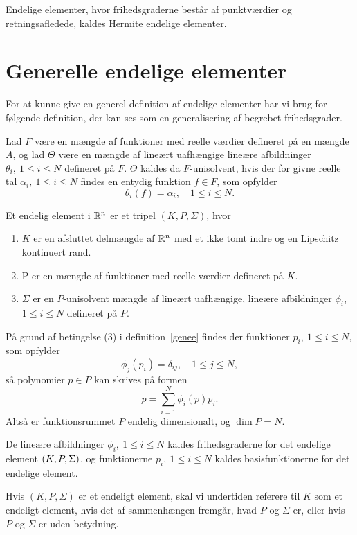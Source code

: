 \begin{definition}
Endelige elementer, hvor frihedsgraderne består af punktværdier og
retningsafledede, kaldes Hermite endelige elementer.
\end{definition}

\section{Generelle endelige elementer}
For at kunne give en generel definition af endelige elementer har vi
brug for følgende definition, der kan ses som en generalisering af
begrebet frihedsgrader.
\begin{definition}
Lad $F$ være en mængde af funktioner med reelle værdier defineret på
en mængde $A$, og lad $\Theta$ være en mængde af lineært uafhængige 
lineære afbildninger $\theta_i, \ 1\leq i \leq N$ defineret på $F$. 
$\Theta$ kaldes da $F$-unisolvent, hvis der for givne reelle tal
$\alpha_i, \ 1\leq i \leq N$ findes en entydig funktion $f\in F$, som
opfylder
\begin{equation}
 \theta_i(f) = \alpha_i, \quad 1\leq i \leq N.
\end{equation}
\end{definition}
\begin{definition} \label{genee}
Et endelig element i $\mathbb{R}^n$ er et tripel $(K,P,\Sigma)$, hvor
\begin{enumerate}
  \item $K$ er en afsluttet delmængde af $\mathbb{R}^n$ med et ikke tomt indre
        og en Lipschitz kontinuert rand.
  \item P er en mængde af funktioner med reelle værdier defineret på $K$.
  \item $\Sigma$ er en $P$-unisolvent mæng\-de af li\-ne\-ært
        u\-af\-hæn\-gi\-ge, li\-ne\-ære af\-bild\-ning\-er 
        $\phi_i$, \newline $1\leq i \leq N$ defineret på $P$.
\end{enumerate}
\end{definition}
\begin{remark}
På grund af betingelse (3) i definition~\ref{genee} findes der funktioner $p_i, \
1\leq i \leq N$, som opfylder
\begin{equation}
  \phi_j (p_i) = \delta_{ij}, \quad 1\leq j \leq N,
\end{equation}
så polynomier $p\in P$ kan skrives på formen
\begin{equation}
  p = \sum_{i=1}^N \phi_i(p)p_i .
\end{equation}
Altså er funktionsrummet $P$ endelig dimensionalt, og $\dim P=N$.
\end{remark}
\begin{definition}
De lineære afbildninger $\phi_i, \ 1\leq i\leq N$ kaldes
frihedsgraderne for det endelige element $(K,P,\Sigma)$, og funktionerne $p_i, \
1\leq i\leq N$ kaldes basisfunktionerne for det endelige element.
\end{definition}
Hvis $(K,P,\Sigma)$ er et endeligt element, skal vi undertiden referere
til $K$ som et endeligt element, hvis det af sammenhængen fremgår, hvad
$P$ og $\Sigma$ er, eller hvis $P$ og $\Sigma$ er uden betydning.
